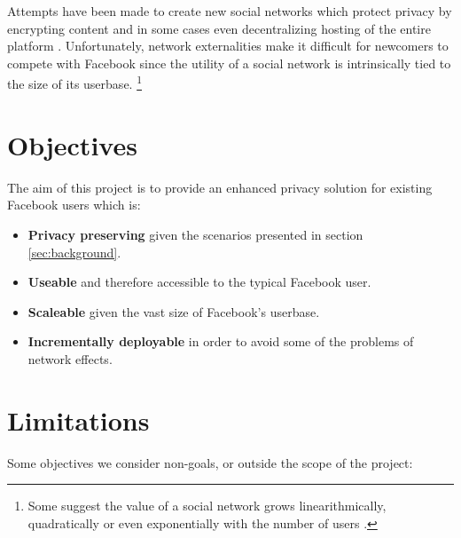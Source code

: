 Attempts have been made to create new social networks which protect privacy by encrypting content and in some cases even decentralizing hosting of the entire platform \cite{pidder} \cite{diaspora}. Unfortunately, network externalities make it difficult for newcomers to compete with Facebook since the utility of a social network is intrinsically tied to the size of its userbase. \footnote{Some suggest the value of a social network grows linearithmically, quadratically or even exponentially with the number of users \cite{fb-network} \cite{metcalf}.}


\section{Objectives}
\label{sec:objectives}

The aim of this project is to provide an enhanced privacy solution for existing Facebook users which is:

\begin{itemize}

    \item \textbf{Privacy preserving} given the scenarios presented in section \ref{sec:background}.

    \item \textbf{Useable} and therefore accessible to the typical Facebook user.

    \item \textbf{Scaleable} given the vast size of Facebook's userbase. 
    
    \item \textbf{Incrementally deployable} in order to avoid some of the problems of network effects.

\end{itemize}


\section{Limitations}
\label{sec:limit}

Some objectives we consider non-goals, or outside the scope of the project:

